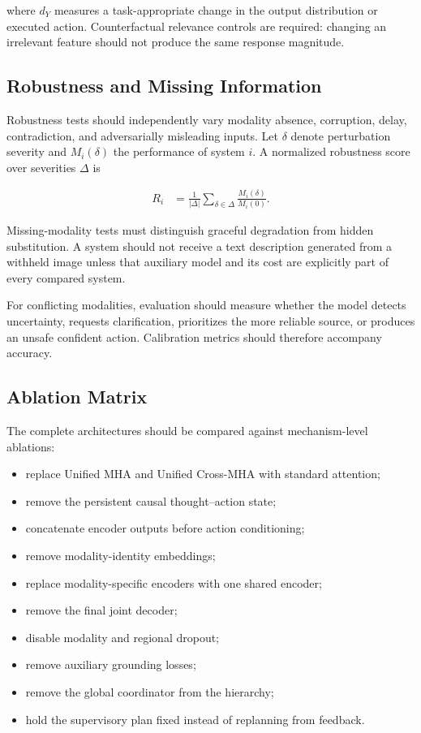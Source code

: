 where $d_Y$ measures a task-appropriate change in the output distribution or executed action. Counterfactual relevance controls are required: changing an irrelevant feature should not produce the same response magnitude.

\subsection{\textbf{Robustness and Missing Information}}

Robustness tests should independently vary modality absence, corruption, delay, contradiction, and adversarially misleading inputs. Let $\delta$ denote perturbation severity and $M_i(\delta)$ the performance of system $i$. A normalized robustness score over severities $\Delta$ is

\begin{equation}
\begin{aligned}
    R_i
    &= \frac{1}{|\Delta|}
       \sum_{\delta\in\Delta}
       \frac{M_i(\delta)}{M_i(0)}.
\end{aligned}
\label{eq:normalized_robustness}
\end{equation}

Missing-modality tests must distinguish graceful degradation from hidden substitution. A system should not receive a text description generated from a withheld image unless that auxiliary model and its cost are explicitly part of every compared system.

For conflicting modalities, evaluation should measure whether the model detects uncertainty, requests clarification, prioritizes the more reliable source, or produces an unsafe confident action. Calibration metrics should therefore accompany accuracy.

\subsection{\textbf{Ablation Matrix}}

The complete architectures should be compared against mechanism-level ablations:

\begin{itemize}
    \item replace Unified MHA and Unified Cross-MHA with standard attention;
    \item remove the persistent causal thought--action state;
    \item concatenate encoder outputs before action conditioning;
    \item remove modality-identity embeddings;
    \item replace modality-specific encoders with one shared encoder;
    \item remove the final joint decoder;
    \item disable modality and regional dropout;
    \item remove auxiliary grounding losses;
    \item remove the global coordinator from the hierarchy;
    \item hold the supervisory plan fixed instead of replanning from feedback.
\end{itemize}

